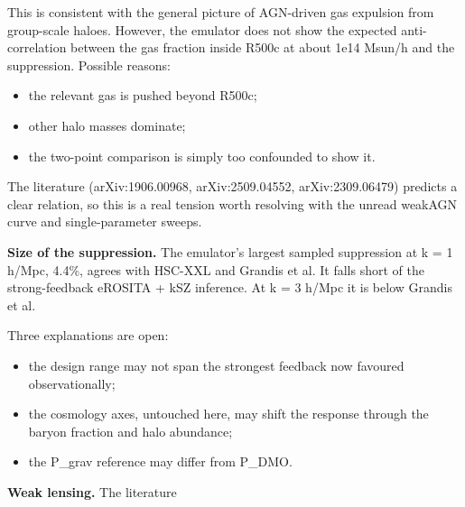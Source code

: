 \documentclass[11pt,a4paper]{article}
\begin{document}
This is consistent with the general picture of AGN-driven gas expulsion from group-scale haloes. However, the emulator does not show the expected anti-correlation between the gas fraction inside R500c at about 1e14 Msun/h and the suppression. Possible reasons:

\begin{itemize}
  \item the relevant gas is pushed beyond R500c;
  \item other halo masses dominate;
  \item the two-point comparison is simply too confounded to show it.
\end{itemize}
The literature (arXiv:1906.00968, arXiv:2509.04552, arXiv:2309.06479) predicts a clear relation, so this is a real tension worth resolving with the unread weakAGN curve and single-parameter sweeps.

\textbf{Size of the suppression.} The emulator's largest sampled suppression at k = 1 h/Mpc, 4.4\%, agrees with HSC-XXL and Grandis et al. It falls short of the strong-feedback eROSITA + kSZ inference. At k = 3 h/Mpc it is below Grandis et al.

Three explanations are open:

\begin{itemize}
  \item the design range may not span the strongest feedback now favoured observationally;
  \item the cosmology axes, untouched here, may shift the response through the baryon fraction and halo abundance;
  \item the P\_grav reference may differ from P\_DMO.
\end{itemize}
\textbf{Weak lensing.} The literature
\end{document}
